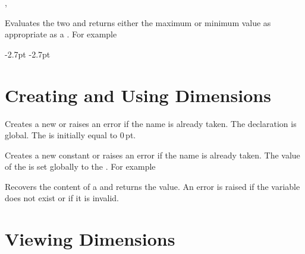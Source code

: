 \documentclass[oneside]{book}
\begin{document}
\begin{function}{\DimMathMax,\DimMathMin}
\begin{syntax}
  
  
\end{syntax}
Evaluates the two  and returns either the
maximum or minimum value as appropriate as a .
For example
\begin{demohigh}
\DimMathMax {3.5pt} {-2.7pt}
\DimMathMin {3.5pt} {-2.7pt}
\end{demohigh}
\end{function}

\section{Creating and Using Dimensions}

\begin{function}{\DimNew}
\begin{syntax}
 
\end{syntax}
Creates a new  or raises an error if the name is
already taken. The declaration is global. The 
is initially equal to $0$\,pt.
\end{function}

\begin{function}{\DimConst}
\begin{syntax}
  
\end{syntax}
Creates a new constant  or raises an error if the
name is already taken. The value of the  is set
globally to the . For example
\begin{demohigh}
\DimConst \cFooSomeDim {1cm}
\DimUse \cFooSomeDim
\end{demohigh}
\end{function}

\begin{function}{\DimUse}
\begin{syntax}
 
\end{syntax}
Recovers the content of a  and returns the value.
An error is raised if the variable does not exist or if it is invalid.
\end{function}

\section{Viewing Dimensions}
\end{document}
